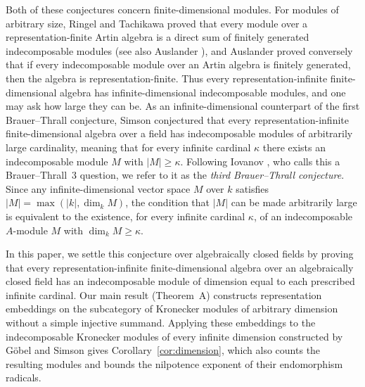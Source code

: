 \documentclass[a4paper,reqno,10pt]{amsart}
\theoremstyle{definition}
\newcommand{\dm}{\dim_k}
\numberwithin{equation}{section}
\begin{document}
Both of these conjectures concern finite-dimensional modules. For modules of arbitrary size,
Ringel and Tachikawa \cite[Corollary~4.4]{RingelTachikawa} proved that every module over
a representation-finite Artin algebra is a direct sum of finitely
generated indecomposable modules (see also Auslander \cite[pp.~1--2]{AuslanderLarge}), and
Auslander \cite[Theorem~A]{AuslanderLarge} proved conversely that if every
indecomposable module over an Artin algebra is finitely generated, then
the algebra is representation-finite. Thus every representation-infinite
finite-dimensional algebra has infinite-dimensional indecomposable
modules, and one may ask how large they can be.
As an infinite-dimensional counterpart of the first Brauer--Thrall conjecture,
Simson \cite[Conjecture~$1_\infty$]{SimsonCorner}
conjectured that
every representation-infinite finite-dimensional algebra over a field has
indecomposable modules of arbitrarily large cardinality, meaning that for every
infinite cardinal $\kappa$ there exists an indecomposable module $M$
with $|M|\ge\kappa$. Following Iovanov \cite[\S6.1]{Iovanov}, who calls this a
Brauer--Thrall~3 question, we refer to it as the \emph{third Brauer--Thrall
conjecture}. Since any infinite-dimensional
vector space $M$ over $k$ satisfies $|M|=\max(|k|,\dm M)$, the condition
that $|M|$ can be made arbitrarily large is equivalent to the existence, for
every infinite cardinal $\kappa$, of an indecomposable $A$-module $M$ with
$\dm M\ge\kappa$.

In this paper, we settle this conjecture over algebraically closed fields by proving that every representation-infinite
finite-dimensional algebra over an algebraically closed field has
an indecomposable module of dimension equal to each prescribed infinite
cardinal. Our main result (Theorem~A) constructs representation embeddings on the
subcategory of Kronecker modules of arbitrary dimension without a simple injective summand. Applying these
embeddings to the indecomposable Kronecker modules of every infinite dimension
constructed by G\"obel and Simson \cite{GoebelSimson} gives
Corollary~\ref{cor:dimension}, which also counts the resulting modules and
bounds the nilpotence exponent of their endomorphism radicals.
\end{document}
